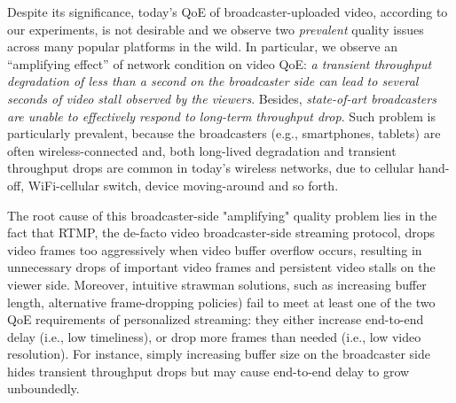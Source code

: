 %
%

Despite its significance, today's QoE of broadcaster-uploaded video,
according to our experiments, is not desirable and we observe two {\em prevalent}
quality issues across many popular platforms in the wild.
In particular, we observe an ``amplifying effect'' of network
condition on video QoE: {\em a transient throughput degradation
of less than a second on the broadcaster side can lead to
several seconds of video stall observed by the viewers}. Besides, {\em state-of-art broadcasters are unable to effectively respond to long-term throughput drop}.
Such problem is particularly prevalent, because the broadcasters
(e.g., smartphones, tablets) are often wireless-connected and, both
long-lived degradation and transient throughput drops are common in today's wireless networks,
due to cellular hand-off, WiFi-cellular
switch, device moving-around and so forth.


The root cause of this broadcaster-side "amplifying" quality problem
lies in the fact that RTMP, the de-facto video broadcaster-side streaming protocol,
drops video frames too aggressively when video buffer overflow
occurs, resulting in unnecessary drops of important video frames and
persistent video stalls on the viewer side.
Moreover, intuitive strawman solutions, such as increasing
buffer length, alternative frame-dropping policies) fail to meet at least one
of the two QoE requirements of personalized streaming:
they either increase end-to-end delay (i.e., low timeliness), or drop more
frames than needed (i.e., low video resolution).
For instance, simply increasing buffer size on the broadcaster
side hides transient throughput drops but may cause end-to-end
delay to grow unboundedly.

